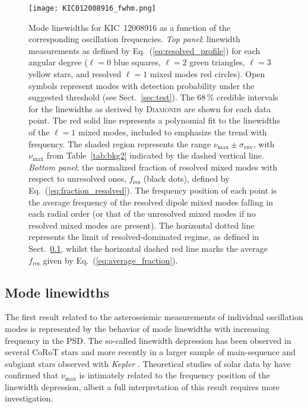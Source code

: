 \documentclass[structabstract]{aa}
\newcommand{\kepler}{\textit{Kepler} }
\newcommand{\numax}{\nu_\mathrm{max}}
\newcommand{\diamonds}{\textsc{D\large{iamonds}}}
\newcommand{\kic}{KIC~12008916}
\begin{document}
\begin{figure}
   \centering
   \texttt{[image: KIC012008916\_fwhm.png]}
      \caption{Mode linewidths for \kic\,\,as a function of the corresponding oscillation frequencies. \textit{Top panel}: linewidth measurements as defined by Eq.~(\ref{eq:resolved_profile}) for each angular degree ($\ell = 0$ blue squares, $\ell = 2$ green triangles, $\ell = 3$ yellow stars, and resolved $\ell = 1$ mixed modes red circles). Open symbols represent modes with detection probability under the suggested threshold (see Sect.~\ref{sec:test}). The 68\,\% credible intervals for the linewidths as derived by \diamonds\,\,are shown for each data point. The red solid line represents a polynomial fit to the linewidths of the $\ell = 1$ mixed modes, included to emphasize the trend with frequency. The shaded region represents the range $\numax \pm \sigma_\mathrm{env}$, with $\numax$ from Table~\ref{tab:bkg2} indicated by the dashed vertical line. \textit{Bottom panel}: the normalized fraction of resolved mixed modes with respect to unresolved ones, $f_\mathrm{res}$ (black dots), defined by Eq.~(\ref{eq:fraction_resolved}). The frequency position of each point is the average frequency of the resolved dipole mixed modes falling in each radial order (or that of the unresolved mixed modes if no resolved mixed modes are present). The horizontal dotted line represents the limit of resolved-dominated regime, as defined in Sect.~\ref{sec:fwhm}, whilst the horizontal dashed red line marks the average $f_\mathrm{res}$ given by Eq.~(\ref{eq:average_fraction}).}
    \label{fig:fwhm}
\end{figure}

\subsection{Mode linewidths}
\label{sec:fwhm}
The first result related to the asteroseismic measurements of individual oscillation modes is represented by the behavior of mode linewidths with increasing frequency in the PSD. The so-called linewidth depression has been observed in several CoRoT stars \citep{Benomar09gamma,Barban09,Deheuvels10,Ballot11} and more recently in a larger sample of main-sequence and subgiant stars observed with \kepler \citep{Benomar13,App14}. Theoretical studies of solar data by \cite{Belkacem11} have confirmed that $\numax$ is intimately related to the frequency position of the linewidth depression, albeit a full interpretation of this result requires more investigation.
\end{document}
